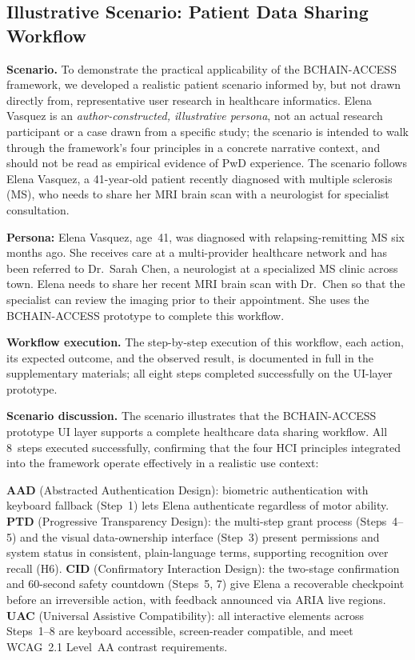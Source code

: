 \documentclass[journal,onecolumn]{IEEEtran}
\begin{document}
\subsection{Illustrative Scenario: Patient Data Sharing Workflow}
\label{subsec:case-study}

\noindent\textbf{Scenario.} 
To demonstrate the practical applicability of the BCHAIN-ACCESS
framework, we developed a realistic patient scenario informed by,
but not drawn directly from,
representative user research in healthcare
informatics\cite{magsamen2019patient}. Elena Vasquez is an
\emph{author-constructed, illustrative persona}, not an actual
research participant or a case drawn from a specific study; the
scenario is intended to walk through the framework's four principles
in a concrete narrative context, and should not be read as empirical
evidence of PwD experience. The scenario follows Elena
Vasquez, a 41-year-old patient recently diagnosed with multiple
sclerosis (MS), who needs to share her MRI brain scan with a
neurologist for specialist consultation.

\textbf{Persona:} Elena Vasquez, age~41, was diagnosed with
relapsing-remitting MS six months ago. She receives care at a
multi-provider healthcare network and has been referred to
Dr.~Sarah Chen, a neurologist at a specialized MS clinic across town.
Elena needs to share her recent MRI brain scan with Dr.~Chen so that
the specialist can review the imaging prior to their appointment.
She uses the BCHAIN-ACCESS prototype to complete this workflow.

\noindent\textbf{Workflow execution.} 
The step-by-step execution of this workflow, each action, its expected outcome, and the observed result, is documented in full in the supplementary materials; all eight steps completed successfully on the UI-layer prototype.



\noindent\textbf{Scenario discussion.} 
The scenario illustrates that the BCHAIN-ACCESS prototype UI layer supports a
complete healthcare data sharing workflow. All
8~steps executed successfully, confirming that the four HCI principles
integrated into the framework operate effectively in a realistic use
context:

\textbf{AAD} (Abstracted Authentication Design): biometric authentication with keyboard fallback (Step~1) lets Elena authenticate regardless of motor ability. \textbf{PTD} (Progressive Transparency Design): the multi-step grant process (Steps~4--5) and the visual data-ownership interface (Step~3) present permissions and system status in consistent, plain-language terms, supporting recognition over recall (H6). \textbf{CID} (Confirmatory Interaction Design): the two-stage confirmation and 60-second safety countdown (Steps~5, 7) give Elena a recoverable checkpoint before an irreversible action, with feedback announced via ARIA live regions. \textbf{UAC} (Universal Assistive Compatibility): all interactive elements across Steps~1--8 are keyboard accessible, screen-reader compatible, and meet WCAG~2.1 Level~AA contrast requirements.
\end{document}
